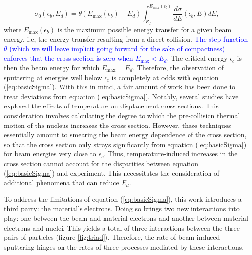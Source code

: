 \documentclass[twoside,twocolumn,9pt]{article}
\begin{document}
\begin{equation}
  \sigma_0(\epsilon_b, {E}_d)
  =
  \theta(E_\text{max}(\epsilon_b) - E_d)
  \int_{E_d}^{E_\text{max}(\epsilon_b)}
  \frac{d\sigma}{dE}(\epsilon_b, E)
  dE,
  \label{eq:basicSigma}
\end{equation}
%
where $E_\text{max}(\epsilon_b)$
is the maximum possible energy transfer for a given beam energy, i.e, the
energy transfer resulting from a direct collision.
\textcolor{blue}{
The step function $\theta$ (which we will leave implicit going forward for the
sake of compactness) enforces that the cross section is zero when $E_\text{max}
< E_d$.
}
The critical energy $\epsilon_c$ is then the beam energy for which
$E_\text{max}=E_d$.
Therefore, the observation of sputtering at energies well below $\epsilon_c$ is
completely at odds with equation (\ref{eq:basicSigma}).
With this in mind, a fair amount of work has been done to treat deviations from
equation (\ref{eq:basicSigma}).
Notably, several studies have explored the effects of temperature on
displacement cross sections. \cite{Meyer2012,Susi2016,Yoshimura2018}
This consideration involves calculating the degree to which the pre-collision
thermal motion of the nucleus increases the cross section.
However, these techniques essentially amount to smearing the beam energy
dependence of the cross section, so that the cross section only strays
significantly from equation (\ref{eq:basicSigma}) for beam energies very close
to $\epsilon_c$.
Thus, temperature-induced increases in the cross section cannot account for the
disparities between equation (\ref{eq:basicSigma}) and experiment.
This necessitates the consideration of additional phenomena that can reduce
$E_d$.

To address the limitations of equation (\ref{eq:basicSigma}), this work
introduces a third party: the material's electrons.
Doing so brings two new interactions into play: one between the beam and
material electrons and another between material electrons and nuclei.
This yields a total of three interactions between the three pairs of particles
(figure \ref{fig:triad}).
Therefore, the rate of beam-induced sputtering hinges on the rates of three
processes mediated by these interactions.
\end{document}

